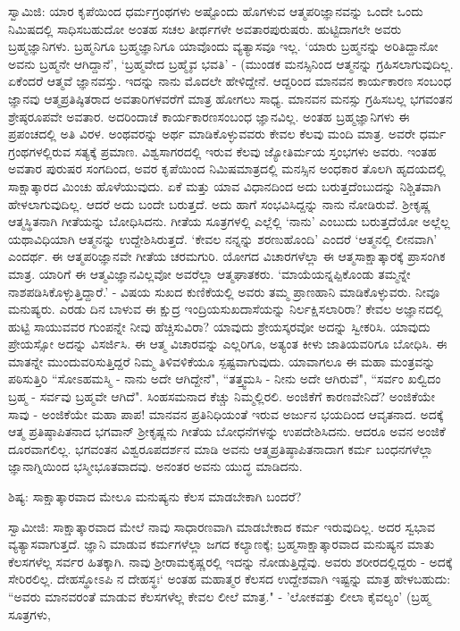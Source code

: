 ಸ್ವಾಮಿಜಿ: ಯಾರ ಕೃಪೆಯಿಂದ ಧರ್ಮಗ್ರಂಥಗಳು ಅಷ್ಟೊಂದು ಹೊಗಳುವ ಆತ್ಮಪರಿಜ್ಞಾನವನ್ನು ಒಂದೇ ಒಂದು ನಿಮಿಷದಲ್ಲಿ ಸಾಧಿಸಬಹುದೋ ಅಂತಹ ಸಚಲ ತೀರ್ಥಗಳೇ ಅವತಾರಪುರುಷರು. ಹುಟ್ಟಿದಾಗಲೇ ಅವರು ಬ್ರಹ್ಮಜ್ಞಾನಿಗಳು. ಬ್ರಹ್ಮನಿಗೂ ಬ್ರಹ್ಮಜ್ಞಾನಿಗೂ ಯಾವೊಂದು ವ್ಯತ್ಯಾಸವೂ ಇಲ್ಲ. ‘ಯಾರು ಬ್ರಹ್ಮನನ್ನು ಅರಿತಿದ್ದಾನೋ ಅವನು ಬ್ರಹ್ಮನೇ ಆಗಿದ್ದಾನೆ’, ‘ಬ್ರಹ್ಮವೇದ ಬ್ರಹ್ಮೈವ ಭವತಿ’ - (ಮುಂಡಕ  ಮನಸ್ಸಿನಿಂದ ಆತ್ಮನನ್ನು ಗ್ರಹಿಸಲಾಗುವುದಿಲ್ಲ. ಏಕೆಂದರೆ ಆತ್ಮವೆ ಜ್ಞಾನವಸ್ತು. ಇದನ್ನು ನಾನು ಮೊದಲೇ ಹೇಳಿದ್ದೇನೆ. ಆದ್ದರಿಂದ ಮಾನವನ ಕಾರ್ಯಕಾರಣ ಸಂಬಂಧ ಜ್ಞಾನವು ಆತ್ಮಪ್ರತಿಷ್ಠಿತರಾದ ಅವತಾರಿಗಳವರೆಗೆ ಮಾತ್ರ ಹೋಗಲು ಸಾಧ್ಯ. ಮಾನವನ ಮನಸ್ಸು ಗ್ರಹಿಸಬಲ್ಲ ಭಗವಂತನ ಶ್ರೇಷ್ಠರೂಪವೇ ಅವತಾರ. ಅದರಿಂದಾಚೆ ಕಾರ್ಯಕಾರಣಸಂಬಂಧ ಜ್ಞಾನವಿಲ್ಲ. ಅಂತಹ ಬ್ರಹ್ಮಜ್ಞಾನಿಗಳು ಈ ಪ್ರಪಂಚದಲ್ಲಿ ಅತಿ ವಿರಳ. ಅಂಥವರನ್ನು ಅರ್ಥ ಮಾಡಿಕೊಳ್ಳುವವರು ಕೇವಲ ಕೆಲವು ಮಂದಿ ಮಾತ್ರ. ಅವರೇ ಧರ್ಮ ಗ್ರಂಥಗಳಲ್ಲಿರುವ ಸತ್ಯಕ್ಕೆ ಪ್ರಮಾಣ. ವಿಶ್ವಸಾಗರದಲ್ಲಿ ಇರುವ ಕೆಲವು ಜ್ಯೋತಿರ್ಮಯ ಸ್ತಂಭಗಳು ಅವರು. ಇಂತಹ ಅವತಾರ ಪುರುಷರ ಸಂಗದಿಂದ, ಅವರ ಕೃಪೆಯಿಂದ ನಿಮಿಷಮಾತ್ರದಲ್ಲಿ ಮನಸ್ಸಿನ ಅಂಧಕಾರ ತೊಲಗಿ ಹೃದಯದಲ್ಲಿ ಸಾಕ್ಷಾತ್ಕಾರದ ಮಿಂಚು ಹೊಳೆಯುವುದು. ಏಕೆ ಮತ್ತು ಯಾವ ವಿಧಾನದಿಂದ ಅದು ಬರುತ್ತದೆಂಬುದನ್ನು ನಿಶ್ಚಿತವಾಗಿ ಹೇಳಲಾಗುವುದಿಲ್ಲ. ಆದರೆ ಅದು ಬಂದೇ ಬರುತ್ತದೆ. ಅದು ಹಾಗೆ ಸಂಭವಿಸಿದ್ದನ್ನು ನಾನು ನೋಡಿರುವೆ. ಶ‍್ರೀಕೃಷ್ಣ ಆತ್ಮಸ್ಥಿತನಾಗಿ ಗೀತೆಯನ್ನು ಬೋಧಿಸಿದನು. ಗೀತೆಯ ಸೂತ್ರಗಳಲ್ಲಿ ಎಲ್ಲೆಲ್ಲಿ ‘ನಾನು’ ಎಂಬುದು ಬರುತ್ತದೆಯೋ ಅಲ್ಲೆಲ್ಲ ಯಥಾವಿಧಿಯಾಗಿ ಆತ್ಮನನ್ನು ಉದ್ದೇಶಿಸಿರುತ್ತದೆ. ‘ಕೇವಲ ನನ್ನನ್ನು ಶರಣುಹೊಂದಿ’ ಎಂದರೆ ‘ಆತ್ಮನಲ್ಲಿ ಲೀನವಾಗಿ’ ಎಂದರ್ಥ. ಈ ಆತ್ಮಪರಿಜ್ಞಾನವೇ ಗೀತೆಯ ಚರಮಗುರಿ. ಯೋಗದ ವಿಚಾರಗಳೆಲ್ಲಾ ಈ ಆತ್ಮಸಾಕ್ಷಾತ್ಕಾರಕ್ಕೆ ಪ್ರಾಸಂಗಿಕ ಮಾತ್ರ. ಯಾರಿಗೆ ಈ ಆತ್ಮವಿಜ್ಞಾನವಿಲ್ಲವೋ ಅವರೆಲ್ಲಾ ಆತ್ಮಘಾತಕರು. ‘ಮಾಯೆಯನ್ನಪ್ಪಿಕೊಂಡು ತಮ್ಮನ್ನೇ ನಾಶಪಡಿಸಿಕೊಳ್ಳುತ್ತಿದ್ದಾರೆ.’ - ವಿಷಯ ಸುಖದ ಕುಣಿಕೆಯಲ್ಲಿ ಅವರು ತಮ್ಮ ಪ್ರಾಣಹಾನಿ ಮಾಡಿಕೊಳ್ಳುವರು. ನೀವೂ ಮನುಷ್ಯರು. ಎರಡು ದಿನ ಬಾಳುವ ಈ ಕ್ಷುದ್ರ ಇಂದ್ರಿಯಸುಖದಾಸೆಯನ್ನು ನಿರ್ಲಕ್ಷಿಸಲಾರಿರಾ? ಕೇವಲ ಅಜ್ಞಾನದಲ್ಲಿ ಹುಟ್ಟಿ ಸಾಯುವವರ ಗುಂಪನ್ನೇ ನೀವು ಹೆಚ್ಚಿಸುವಿರಾ? ಯಾವುದು ಶ್ರೇಯಸ್ಕರವೋ ಅದನ್ನು ಸ್ವೀಕರಿಸಿ. ಯಾವುದು ಪ್ರೇಯಸ್ಸೋ ಅದನ್ನು ವಿಸರ್ಜಿಸಿ. ಈ ಆತ್ಮ ವಿಚಾರವನ್ನು ಎಲ್ಲರಿಗೂ, ಅತ್ಯಂತ ಕೀಳು ಜಾತಿಯವರಿಗೂ ಬೋಧಿಸಿ. ಈ ಮಾತನ್ನೇ ಮುಂದುವರಿಸುತ್ತಿದ್ದರೆ ನಿಮ್ಮ ತಿಳಿವಳಿಕೆಯೂ ಸ್ಪಷ್ಟವಾಗುವುದು. ಯಾವಾಗಲೂ ಈ ಮಹಾ ಮಂತ್ರವನ್ನು ಪಠಿಸುತ್ತಿರಿ “ಸೋಽಹಮಸ್ಮಿ - ನಾನು ಅದೇ ಆಗಿದ್ದೇನೆ", “ತತ್ತ್ವಮಸಿ - ನೀನು ಅದೇ ಆಗಿರುವೆ", “ಸರ್ವಂ ಖಲ್ವಿದಂ ಬ್ರಹ್ಮ - ಸರ್ವವು ಬ್ರಹ್ಮವೇ ಆಗಿದೆ". ಸಿಂಹಸಮನಾದ ಕೆಚ್ಚು ನಿಮ್ಮಲ್ಲಿರಲಿ. ಅಂಜಿಕೆಗೆ ಕಾರಣವೇನಿದೆ? ಅಂಜಿಕೆಯೇ ಸಾವು - ಅಂಜಿಕೆಯೇ ಮಹಾ ಪಾಪ! ಮಾನವನ ಪ್ರತಿನಿಧಿಯಂತೆ ಇರುವ ಅರ್ಜುನ ಭಯದಿಂದ ಆವೃತನಾದ. ಅದಕ್ಕೆ ಆತ್ಮ ಪ್ರತಿಷ್ಠಾಪಿತನಾದ ಭಗವಾನ್ ಶ‍್ರೀಕೃಷ್ಣನು ಗೀತೆಯ ಬೋಧನೆಗಳನ್ನು ಉಪದೇಶಿಸಿದನು. ಆದರೂ ಅವನ ಅಂಜಿಕೆ ದೂರವಾಗಲಿಲ್ಲ. ಭಗವಂತನ ವಿಶ್ವರೂಪದರ್ಶನ ಮಾಡಿ ಅವನು ಆತ್ಮಪ್ರತಿಷ್ಠಾಪಿತನಾದಾಗ ಕರ್ಮ ಬಂಧನಗಳೆಲ್ಲಾ ಜ್ಞಾನಾಗ್ನಿಯಿಂದ ಭಸ್ಮೀಭೂತವಾದವು. ಅನಂತರ ಅವನು ಯುದ್ಧ ಮಾಡಿದನು.

ಶಿಷ್ಯ: ಸಾಕ್ಷಾತ್ಕಾರವಾದ ಮೇಲೂ ಮನುಷ್ಯನು ಕೆಲಸ ಮಾಡಬೇಕಾಗಿ ಬಂದರೆ?

ಸ್ವಾಮೀಜಿ: ಸಾಕ್ಷಾತ್ಕಾರವಾದ ಮೇಲೆ ನಾವು ಸಾಧಾರಣವಾಗಿ ಮಾಡಬೇಕಾದ ಕರ್ಮ ಇರುವುದಿಲ್ಲ. ಅದರ ಸ್ವಭಾವ ವ್ಯತ್ಯಾಸವಾಗುತ್ತದೆ. ಜ್ಞಾನಿ ಮಾಡುವ ಕರ್ಮಗಳೆಲ್ಲಾ ಜಗದ ಕಲ್ಯಾಣಕ್ಕೆ; ಬ್ರಹ್ಮಸಾಕ್ಷಾತ್ಕಾರವಾದ ಮನುಷ್ಯನ ಮಾತು ಕೆಲಸಗಳೆಲ್ಲ ಸರ್ವರ ಹಿತಕ್ಕಾಗಿ. ನಾವು ಶ‍್ರೀರಾಮಕೃಷ್ಣರಲ್ಲಿ ಇದನ್ನು ನೋಡುತ್ತಿದ್ದೆವು. ಅವರು ಶರೀರದಲ್ಲಿದ್ದರು - ಅದಕ್ಕೆ ಸೇರಿರಲಿಲ್ಲ. ದೇಹಸ್ಥೋಽಪಿ ನ ದೇಹಸ್ಥಃ‘ ಅಂತಹ ಮಹಾತ್ಮರ ಕೆಲಸದ ಉದ್ದೇಶವಾಗಿ ಇಷ್ಟನ್ನು ಮಾತ್ರ ಹೇಳಬಹುದು: “ಅವರು ಮಾನವರಂತೆ ಮಾಡುವ ಕೆಲಸಗಳೆಲ್ಲ ಕೇವಲ ಲೀಲೆ ಮಾತ್ರ." - ’ಲೋಕವತ್ತು ಲೀಲಾ ಕೈವಲ್ಯಂ' (ಬ್ರಹ್ಮ ಸೂತ್ರಗಳು, 

